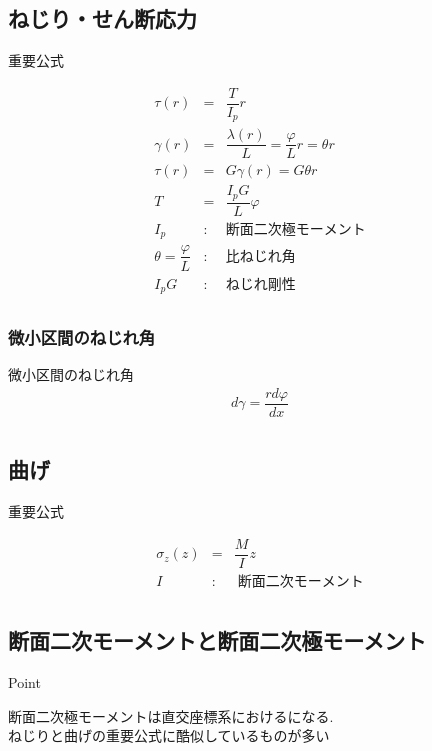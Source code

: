 \documentclass[a4paper]{jsarticle}
\begin{document}
\subsection{ねじり・せん断応力}
\begin{itembox}[l]{重要公式}
    \begin{center}
        \begin{eqnarray*}
            \tau\left(r\right)&=&\dfrac{T}{I_p} r\\
            \gamma\left(r\right)&=&\dfrac{\lambda\left(r\right)}{L}=\dfrac{\varphi}{L}r=\theta r\\
            \tau\left(r\right)&=&G\gamma\left(r\right)=G\theta r\\
            T&=&\dfrac{I_pG}{L}\varphi\\
            I_p&:&断面二次極モーメント\\
            \theta=\dfrac{\varphi}{L}&:&比ねじれ角\\
            I_pG&:&ねじれ剛性\\
        \end{eqnarray*}
    \end{center}
\end{itembox}
\subsubsection{微小区間のねじれ角}
\begin{itembox}[l]{微小区間のねじれ角}
    \begin{eqnarray*}
        d\gamma=\dfrac{rd\varphi}{dx}\\
    \end{eqnarray*}
\end{itembox}
\subsection{曲げ}
\begin{itembox}[l]{重要公式}
    \begin{center}
        \begin{eqnarray*}
            \sigma_z\left(z\right)&=&\dfrac{M}{I}z\\
            I&:&\;断面二次モーメント\\
        \end{eqnarray*}
    \end{center}
\end{itembox}
\subsection{断面二次モーメントと断面二次極モーメント}
\begin{itembox}[l]{Point}
    \begin{center}
        断面二次極モーメントは直交座標系におけるになる.\\
        ねじりと曲げの重要公式に酷似しているものが多い
    \end{center}
\end{itembox}
\end{document}
